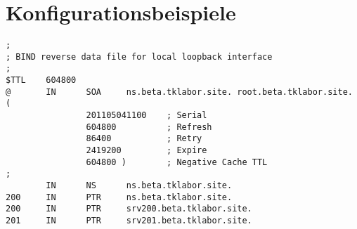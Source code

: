 \section{Konfigurationsbeispiele}
\begin{scriptsize}\label{cfg:bind-reverse-lookup}
\begin{lstlisting}
;
; BIND reverse data file for local loopback interface
;
$TTL    604800
@       IN      SOA     ns.beta.tklabor.site. root.beta.tklabor.site. (
                201105041100    ; Serial
                604800          ; Refresh
                86400           ; Retry
                2419200         ; Expire
                604800 )        ; Negative Cache TTL
;
        IN      NS      ns.beta.tklabor.site.
200     IN      PTR     ns.beta.tklabor.site.
200     IN      PTR     srv200.beta.tklabor.site.
201     IN      PTR     srv201.beta.tklabor.site.
\end{lstlisting}
\end{scriptsize}